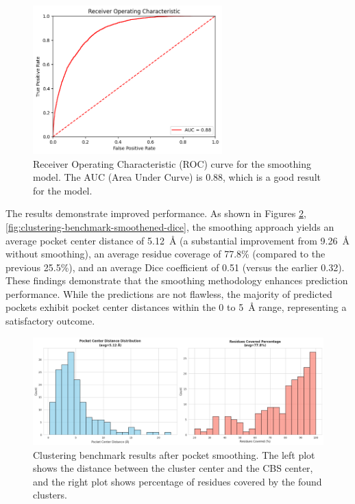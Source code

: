 \begin{figure}[htpb]
    \centering
    \includegraphics[width=0.65\textwidth]{img/smoothing-roc.png}
    \caption{Receiver Operating Characteristic (ROC) curve for the smoothing model. The AUC (Area Under Curve) is 0.88, which is a good result for the model.}
    \label{fig:smoothing-roc}
\end{figure}

The results demonstrate improved performance. As shown in Figures \ref{fig:clustering-benchmark-smoothened}, \ref{fig:clustering-benchmark-smoothened-dice}, the smoothing approach yields an average pocket center distance of 5.12~\AA{} (a substantial improvement from 9.26~\AA{} without smoothing), an average residue coverage of 77.8\% (compared to the previous 25.5\%), and an average Dice coefficient of 0.51 (versus the earlier 0.32). These findings demonstrate that the smoothing methodology enhances prediction performance. While the predictions are not flawless, the majority of predicted pockets exhibit pocket center distances within the 0 to 5~\AA{} range, representing a satisfactory outcome.

\begin{figure}[htbp]
    \centering
    \includegraphics[width=\textwidth]{img/smoothened-1.png}
    \caption{Clustering benchmark results after pocket smoothing. The left plot shows the distance between the cluster center and the CBS center, and the right plot shows percentage of residues covered by the found clusters.}
    \label{fig:clustering-benchmark-smoothened}
\end{figure}

